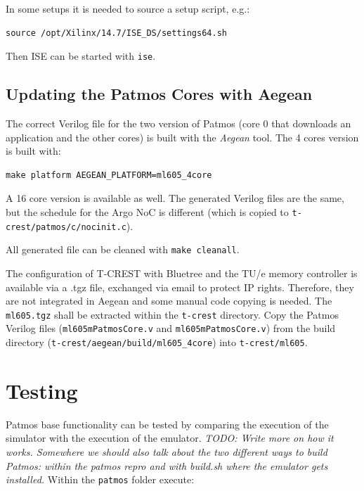 \documentclass[a4paper,fontsize=10pt,twoside,DIV15,BCOR12mm,headinclude=true,footinclude=false,pagesize,bibtotoc]{scrbook}
\newcommand{\code}[1]{{\texttt{#1}}}
\newcommand{\todo}[1]{{\emph{TODO: #1}}}
\begin{document}
In some setups it is needed to source a setup script, e.g.:

\begin{verbatim}
source /opt/Xilinx/14.7/ISE_DS/settings64.sh
\end{verbatim}

Then ISE can be started with \code{ise}.

\subsection{Updating the Patmos Cores with Aegean}

The correct Verilog file for the two version of Patmos (core 0 that downloads an application and the other cores)
is built with the \emph{Aegean} tool. The 4 cores version is built with:

\begin{verbatim}
make platform AEGEAN_PLATFORM=ml605_4core
\end{verbatim}


A 16 core version is available as well. The generated Verilog files are the same,
but the schedule for the Argo NoC is different (which is copied to
\code{t-crest/patmos/c/nocinit.c}).

All generated file can be cleaned with \code{make cleanall}.

The configuration of T-CREST with Bluetree and the TU/e memory controller
is available via a .tgz file, exchanged via email to protect IP rights.
Therefore, they are not integrated in Aegean and some manual code copying is needed.
The \code{ml605.tgz} shall be extracted within the \code{t-crest} directory.
Copy the Patmos Verilog files (\code{ml605mPatmosCore.v} and \code{ml605mPatmosCore.v})
from the build directory (\code{t-crest/aegean/build/ml605\_4core}) into \code{t-crest/ml605}.

\section{Testing}

Patmos base functionality can be tested by comparing the execution of the simulator with
the execution of the emulator. \todo{Write more on how it works. Somewhere we should also
talk about the two different ways to build Patmos: within the patmos repro and with build.sh
where the emulator gets installed.}
Within the \code{patmos} folder execute:
\end{document}
